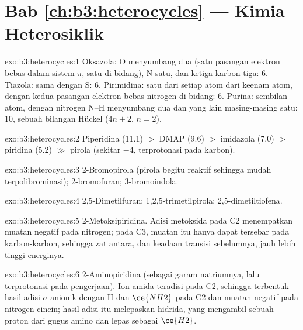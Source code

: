\section*{Bab \ref{ch:b3:heterocycles} --- Kimia Heterosiklik}

\begin{solution}{exo:b3:heterocycles:1}
Oksazola: O menyumbang dua (satu pasangan elektron bebas dalam sistem $\pi$, satu di bidang), N satu, dan
ketiga karbon tiga: 6. Tiazola: sama dengan S: 6. Pirimidina: satu dari setiap
atom dari keenam atom, dengan kedua pasangan elektron bebas nitrogen di bidang: 6. Purina: sembilan atom,
dengan nitrogen N--H menyumbang dua dan yang lain masing-masing satu: 10, sebuah bilangan Hückel
($4n + 2$, $n = 2$).
\end{solution}

\begin{solution}{exo:b3:heterocycles:2}
Piperidina (11.1) $>$ DMAP (9.6) $>$ imidazola (7.0) $>$ piridina (5.2) $\gg$ pirola (sekitar $-4$,
terprotonasi pada karbon).
\end{solution}

\begin{solution}{exo:b3:heterocycles:3}
2-Bromopirola (pirola begitu reaktif sehingga mudah terpolibrominasi);
2-bromofuran; 3-bromoindola.
\end{solution}

\begin{solution}{exo:b3:heterocycles:4}
2,5-Dimetilfuran; 1,2,5-trimetilpirola; 2,5-dimetiltiofena.
\end{solution}

\begin{solution}{exo:b3:heterocycles:5}
2-Metoksipiridina. Adisi metoksida pada C2 menempatkan muatan negatif
 pada nitrogen; pada C3, muatan itu hanya dapat tersebar pada karbon-karbon, sehingga
zat antara, dan keadaan transisi sebelumnya, jauh lebih tinggi energinya.
\end{solution}

\begin{solution}{exo:b3:heterocycles:6}
2-Aminopiridina (sebagai garam natriumnya, lalu terprotonasi pada pengerjaan). Ion amida
teradisi pada C2, sehingga terbentuk hasil adisi $\sigma$ anionik dengan H dan $\ce{NH2}$ pada C2 dan muatan negatif
pada nitrogen cincin; hasil adisi itu melepaskan hidrida, yang mengambil sebuah proton dari
gugus amino dan lepas sebagai $\ce{H2}$.
\end{solution}

